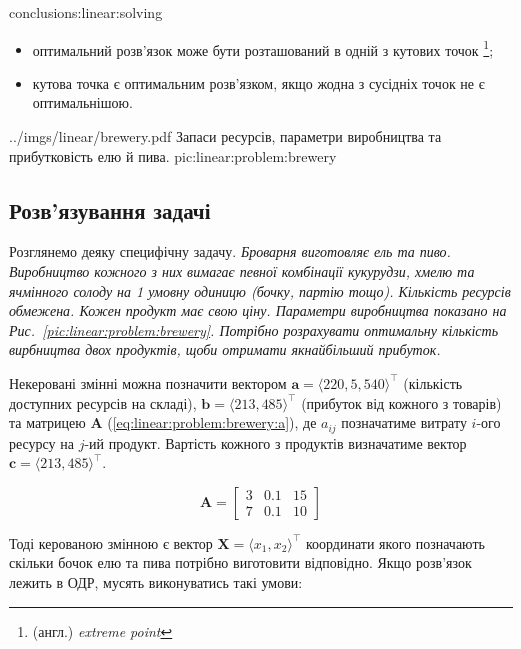 \documentclass[\main/book.tex]{subfiles}
\begin{document}
\begin{conclusions}{conclusions:linear:solving}
\begin{itemize}
 \item оптимальний розв'язок може бути розташований в одній з кутових точок \footnote{(англ.) \textit{extreme point}};
 \item кутова точка є оптимальним розв'язком, якщо жодна з сусідніх точок не є оптимальнішою.
\end{itemize}
\end{conclusions}

\illustration
 {../imgs/linear/brewery.pdf}
 {Запаси ресурсів, параметри ви\-роб\-ниц\-тва та прибутковість елю й пива.}
 {pic:linear:problem:brewery}

\subsection{Розв'язування задачі}

Розглянемо деяку специфічну задачу. \textit{Броварня виготовляє ель та пиво. Виробництво кожного з них вимагає певної комбінації кукурудзи, хмелю та ячмінного солоду на 1 умовну одиницю (бочку, партію тощо). Кількість ресурсів обмежена. Кожен продукт має свою ціну. Параметри виробництва показано на Рис.~\ref{pic:linear:problem:brewery}. Потрібно розрахувати оптимальну кількість вирбництва двох продуктів, щоби отримати якнайбільший прибуток.}

Некеровані змінні можна позначити вектором $\mathbf{a} = {\langle 220, 5, 540 \rangle}^\top$ (кількість доступних ресурсів на складі), $\mathbf{b} = {\langle 213, 485 \rangle}^\top$ (прибуток від кожного з товарів) та матрицею $\mathbf{A}$ (\ref{eq:linear:problem:brewery:a}), де $a_{ij}$ позначатиме витрату $i$-ого ресурсу на $j$-ий продукт. Вартість кожного з продуктів визначатиме вектор $\mathbf{c} = {\langle 213, 485 \rangle}^\top$.

\begin{equation}
 \mathbf{A} = \begin{bmatrix}
               3 & 0.1 & 15 \\
               7 & 0.1 & 10
              \end{bmatrix}
 \label{eq:linear:problem:brewery:a}
\end{equation}

Тоді керованою змінною є вектор $\mathbf{X} = \langle x_1, x_2 \rangle^\top$ координати якого позначають скільки бочок елю та пива потрібно виготовити відповідно. Якщо розв'язок лежить в ОДР, мусять виконуватись такі умови:
\end{document}
